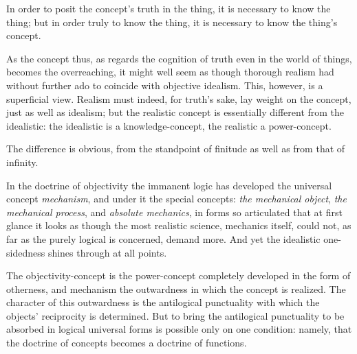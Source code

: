 \documentclass[12pt]{book}
\begin{document}
In order to posit the concept's truth in the thing, it is necessary
to know the thing; but in order truly to know the thing, it is
necessary to know the thing's concept.

As the concept thus, as regards the cognition of truth even in the
world of things, becomes the overreaching, it might well seem as
though thorough realism had without further ado to coincide with
objective idealism. This, however, is a superficial view. Realism
must indeed, for truth's sake, lay weight on the concept, just as
well as idealism; but the realistic concept is essentially
different from the idealistic: the idealistic is a
knowledge-concept, the realistic a power-concept.

The difference is obvious, from the standpoint of finitude as well
as from that of infinity.

In the doctrine of objectivity the immanent logic has developed the
universal concept \emph{mechanism}, and under it the special
concepts: \emph{the mechanical object}, \emph{the mechanical
process}, and \emph{absolute mechanics}, in forms so articulated
that at first glance it looks as though the most realistic science,
mechanics itself, could not, as far as the purely logical is
concerned, demand more. And yet the idealistic one-sidedness shines
through at all points.

The objectivity-concept is the power-concept completely developed in
the form of otherness, and mechanism the outwardness in which the
concept is realized. The character of this outwardness is the
antilogical punctuality with which the objects' reciprocity is
determined. But to bring the antilogical punctuality to be absorbed
in logical universal forms is possible only on one condition:
namely, that the doctrine of concepts becomes a doctrine of
functions.
\end{document}

